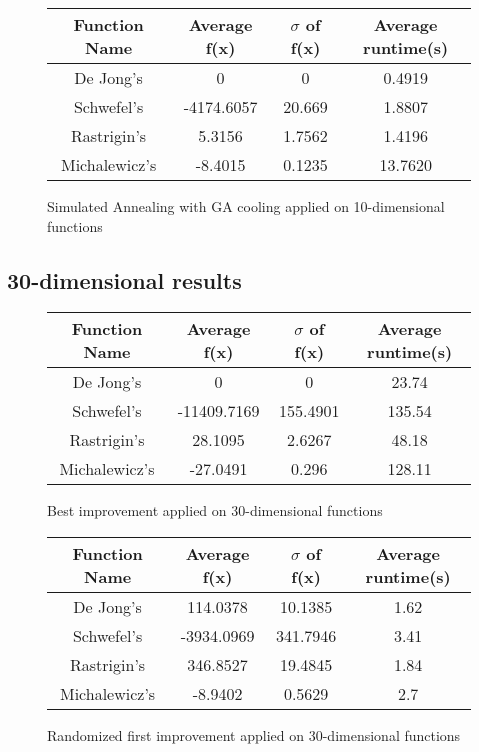 \documentclass{article}
\begin{document}
\begin{figure}[H]
    \begin{tabular}{|c||c|c|c|} \hline
        Function Name & Average f(x) & $\sigma$ of f(x) & Average runtime(s) \\ \hline \hline
        De Jong's & 0 & 0 & 0.4919 \\ \hline
        Schwefel's & -4174.6057 & 20.669 & 1.8807 \\ \hline
        Rastrigin's & 5.3156 & 1.7562 & 1.4196 \\ \hline
        Michalewicz's & -8.4015 & 0.1235 & 13.7620 \\ \hline
    \end{tabular}
    \caption{Simulated Annealing with GA cooling applied on 10-dimensional functions}
    \end{figure}

\subsection{30-dimensional results}

\begin{figure}[H]
\begin{tabular}{|c||c|c|c|} \hline
	Function Name & Average f(x) & $\sigma$ of f(x) & Average runtime(s) \\ \hline \hline
	De Jong's & 0 & 0 & 23.74 \\ \hline
	Schwefel's & -11409.7169 & 155.4901 & 135.54 \\ \hline
	Rastrigin's & 28.1095 & 2.6267 & 48.18 \\ \hline
	Michalewicz's & -27.0491 & 0.296 & 128.11 \\ \hline
\end{tabular}
\caption{Best improvement applied on 30-dimensional functions}
\end{figure}

\begin{figure}[H]
\begin{tabular}{|c||c|c|c|} \hline
	Function Name & Average f(x) & $\sigma$ of f(x) & Average runtime(s) \\ \hline \hline
	De Jong's & 114.0378 & 10.1385 & 1.62 \\ \hline
	Schwefel's & -3934.0969 & 341.7946 & 3.41 \\ \hline
	Rastrigin's & 346.8527 & 19.4845 & 1.84 \\ \hline
	Michalewicz's & -8.9402 & 0.5629 & 2.7 \\ \hline
\end{tabular}
\caption{Randomized first improvement applied on 30-dimensional functions}
\end{figure}
\end{document}
